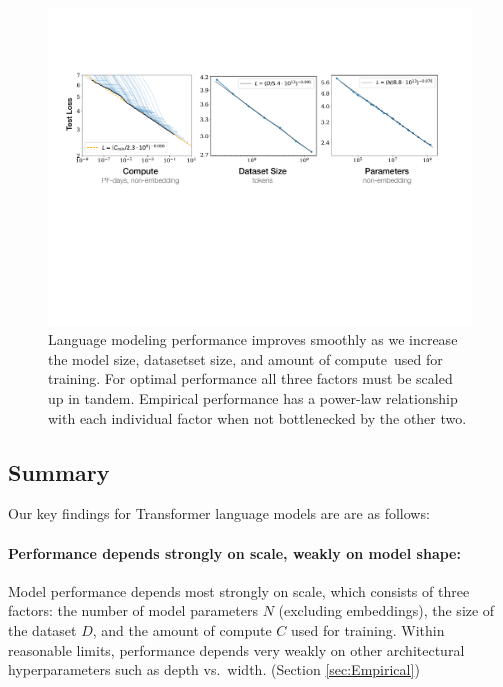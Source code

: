 \documentclass[english]{article}
\begin{document}
\begin{figure}
\noindent \centering{} 
\includegraphics[width=\textwidth]{SimplePowerLaws}

\caption[Summary of simple power laws.]{Language modeling performance improves smoothly as we increase the model size, datasetset size, and amount of compute\footnotemark~used for training.  For optimal performance all three factors must be scaled up in tandem. Empirical performance has a power-law relationship with each individual factor when not bottlenecked by the other two.  \label{fig:BasicPowerLaws}}
\end{figure}


\subsection{Summary}


Our key findings for Transformer language models are are as follows:

\paragraph{Performance depends strongly on scale, weakly on model shape:} Model performance depends most strongly on scale, which consists of three factors: the number of model parameters $N$ (excluding embeddings), the size of the dataset $D$, and the amount of compute $C$ used for training.  Within reasonable limits, performance depends very weakly on other architectural hyperparameters such as depth vs.~width. (Section \ref{sec:Empirical})
\end{document}

